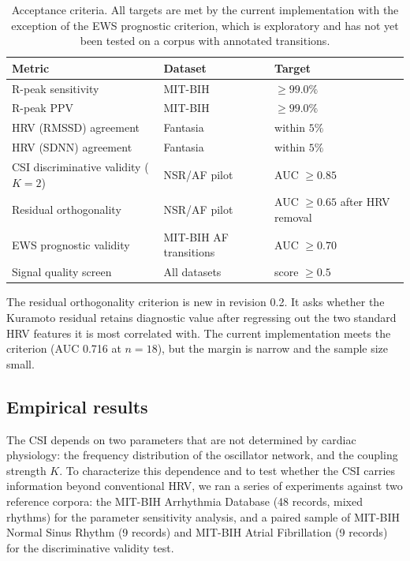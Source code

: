 \documentclass[11pt]{article}
\begin{document}
\begin{table}[h]
\centering
\small
\begin{tabular}{lll}
\toprule
Metric & Dataset & Target \\
\midrule
R-peak sensitivity & MIT-BIH & $\geq 99.0\%$ \\
R-peak PPV & MIT-BIH & $\geq 99.0\%$ \\
HRV (RMSSD) agreement & Fantasia & within $5\%$ \\
HRV (SDNN) agreement & Fantasia & within $5\%$ \\
CSI discriminative validity ($K = 2$) & NSR/AF pilot & AUC $\geq 0.85$ \\
Residual orthogonality & NSR/AF pilot & AUC $\geq 0.65$ after HRV removal \\
EWS prognostic validity & MIT-BIH AF transitions & AUC $\geq 0.70$ \\
Signal quality screen & All datasets & score $\geq 0.5$ \\
\bottomrule
\end{tabular}
\caption{Acceptance criteria. All targets are met by the current
implementation with the exception of the EWS prognostic criterion,
which is exploratory and has not yet been tested on a corpus with
annotated transitions.}
\end{table}

The residual orthogonality criterion is new in revision 0.2. It asks
whether the Kuramoto residual retains diagnostic value after
regressing out the two standard HRV features it is most correlated
with. The current implementation meets the criterion (AUC 0.716 at
$n = 18$), but the margin is narrow and the sample size small.

\subsection{Empirical results}

The CSI depends on two parameters that are not determined by cardiac
physiology: the frequency distribution of the oscillator network, and
the coupling strength $K$. To characterize this dependence and to test
whether the CSI carries information beyond conventional HRV, we ran a
series of experiments against two reference corpora: the MIT-BIH
Arrhythmia Database (48 records, mixed rhythms) for the parameter
sensitivity analysis, and a paired sample of MIT-BIH Normal Sinus
Rhythm (9 records) and MIT-BIH Atrial Fibrillation (9 records) for the
discriminative validity test.
\end{document}
